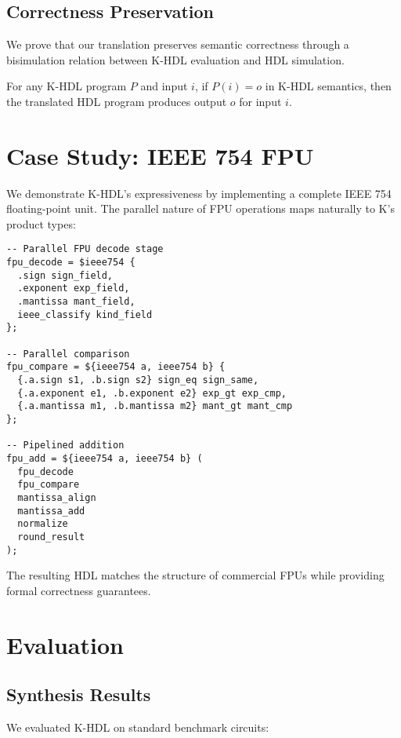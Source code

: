 \documentclass[10pt,twocolumn]{article}
\begin{document}
\subsection{Correctness Preservation}

We prove that our translation preserves semantic correctness through a bisimulation relation between K-HDL evaluation and HDL simulation.

\begin{theorem}
For any K-HDL program $P$ and input $i$, if $P(i) = o$ in K-HDL semantics, then the translated HDL program produces output $o$ for input $i$.
\end{theorem}

\section{Case Study: IEEE 754 FPU}

We demonstrate K-HDL's expressiveness by implementing a complete IEEE 754 floating-point unit. The parallel nature of FPU operations maps naturally to K's product types:

\begin{lstlisting}
-- Parallel FPU decode stage
fpu_decode = $ieee754 {
  .sign sign_field,
  .exponent exp_field,
  .mantissa mant_field,
  ieee_classify kind_field
};

-- Parallel comparison
fpu_compare = ${ieee754 a, ieee754 b} {
  {.a.sign s1, .b.sign s2} sign_eq sign_same,
  {.a.exponent e1, .b.exponent e2} exp_gt exp_cmp,
  {.a.mantissa m1, .b.mantissa m2} mant_gt mant_cmp
};

-- Pipelined addition
fpu_add = ${ieee754 a, ieee754 b} (
  fpu_decode
  fpu_compare  
  mantissa_align
  mantissa_add
  normalize
  round_result
);
\end{lstlisting}

The resulting HDL matches the structure of commercial FPUs while providing formal correctness guarantees.

\section{Evaluation}

\subsection{Synthesis Results}

We evaluated K-HDL on standard benchmark circuits:
\end{document}
